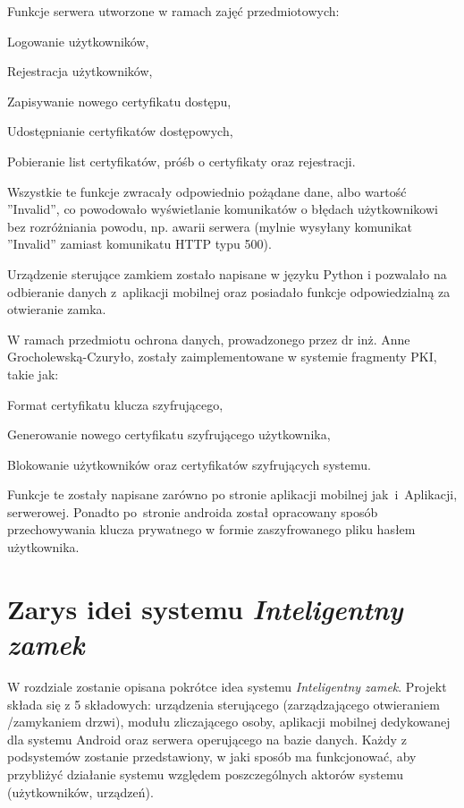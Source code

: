 \documentclass[twoside,10pt]{article}
\def\NazwaSys {\textit{Inteligentny zamek}}
\begin{document}
Funkcje serwera utworzone w ramach zajęć przedmiotowych:
\begin{itemize*}
\item Logowanie użytkowników,
\item Rejestracja użytkowników,
\item Zapisywanie nowego certyfikatu dostępu,
\item Udostępnianie certyfikatów dostępowych,
\item Pobieranie list certyfikatów, próśb o certyfikaty oraz rejestracji.
\end{itemize*}

Wszystkie te funkcje zwracały odpowiednio pożądane dane, albo wartość ''Invalid'', co powodowało wyświetlanie komunikatów o błędach użytkownikowi bez rozróżniania powodu, np. awarii serwera (mylnie wysyłany komunikat ''Invalid'' zamiast komunikatu HTTP typu 500).

Urządzenie sterujące zamkiem zostało napisane w języku Python i pozwalało na odbieranie danych z~aplikacji mobilnej oraz posiadało funkcje odpowiedzialną za otwieranie zamka.

W ramach przedmiotu ochrona danych, prowadzonego przez dr inż. Anne Grocholewską-Czuryło, zostały zaimplementowane w systemie fragmenty PKI, takie jak:
\begin{itemize*}
\item Format certyfikatu klucza szyfrującego,
\item Generowanie nowego certyfikatu szyfrującego użytkownika,
\item Blokowanie użytkowników oraz certyfikatów szyfrujących systemu.
\end{itemize*}

Funkcje te zostały napisane zarówno po stronie aplikacji mobilnej jak~i~Aplikacji, serwerowej. Ponadto po~stronie androida został opracowany sposób przechowywania klucza prywatnego w formie zaszyfrowanego pliku hasłem użytkownika.

\newpage\section{Zarys idei systemu \textsl{\NazwaSys}}\label{sec:ideasystemu}
W rozdziale zostanie opisana pokrótce idea systemu \NazwaSys. Projekt składa się z 5 składowych: urządzenia sterującego (zarządzającego otwieraniem /zamykaniem drzwi), modułu zliczającego osoby, aplikacji mobilnej dedykowanej dla systemu Android oraz serwera operującego na bazie danych. Każdy z podsystemów zostanie przedstawiony, w jaki sposób ma funkcjonować, aby przybliżyć działanie systemu względem poszczególnych aktorów systemu (użytkowników, urządzeń).
\end{document}
